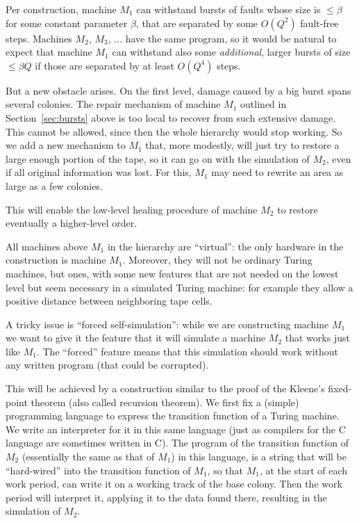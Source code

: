 \documentclass[12pt]{memoir}
\renewcommand{\le}{\leq}
\newcommand{\Q}{Q}
\begin{document}
Per construction, machine \( M_{1} \) can withstand
bursts of faults whose size is \( \le \beta \) for some constant parameter \( \beta \), that
are separated by some \( O(\Q^{2}) \) fault-free steps.
Machines \( M_{2} \), \( M_3 \), \( \dots \) have the same program, so it
would be natural to expect that machine
\( M_{1} \) can withstand also some \emph{additional}, larger bursts
of size \( \le \beta \Q \) if those are separated by at least \( O(\Q^{4}) \) steps.

But a new obstacle arises.
On the first level, damage caused by a big burst spans several colonies.
The repair mechanism of machine \( M_{1} \) outlined in Section~\ref{sec:bursts} above 
is too local to recover from such extensive damage.
This cannot be allowed, since then the whole hierarchy would stop working.
So we add a new mechanism to \( M_{1} \) that, more modestly,
will just try to restore a large enough portion of the
tape, so it can go on with the simulation of \( M_{2} \), even if all 
original information was lost.
For this, \( M_{1} \) may need to rewrite an area as large as a few colonies.

This will enable the low-level healing procedure of 
machine \( M_{2} \) to restore eventually a higher-level order.

All machines above \( M_{1} \) in the hierarchy are
``virtual'': the only hardware in the construction is machine \( M_{1} \).
Moreover, they will not be ordinary Turing machines, but  ones,
with some new features that are not needed on the lowest level but seem necessary
in a simulated Turing machine: for example they
allow a positive distance between neighboring tape cells.

A tricky issue is ``forced self-simulation'': while we are constructing machine \( M_{1} \)
we want to give it the feature that it will simulate a machine \( M_{2} \) that
works just like \( M_{1} \).
The ``forced'' feature means that this simulation should
work without any written program (that could be corrupted).

This will be achieved by
a construction similar to the proof of the Kleene's fixed-point 
theorem (also called recursion theorem).
We first fix a (simple) programming language to express the transition
function of a Turing machine.
We write an interpreter for it in this same language (just as compilers for the 
C language are sometimes written in C).
The program of the transition function of \( M_{2} \)
(essentially the same as that of \( M_{1} \))
in this language, is a string that will be
``hard-wired'' into the transition function of \( M_{1} \), 
so that \( M_{1} \), at the start of each work period, can write
it on a working track of the base colony.
Then the work period will interpret it, 
applying it to the data found there, resulting
in the simulation of \( M_{2} \).
\end{document}

